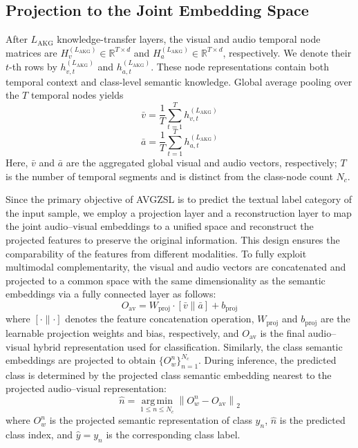 \documentclass[lettersize,journal]{IEEEtran}
\begin{document}
\subsection{Projection to the Joint Embedding Space}
After $L_{\mathrm{AKG}}$ knowledge-transfer layers, the visual and audio temporal node matrices are $H_v^{(L_{\mathrm{AKG}})}\in\mathbb{R}^{T\times d}$ and $H_a^{(L_{\mathrm{AKG}})}\in\mathbb{R}^{T\times d}$, respectively. We denote their $t$-th rows by $h_{v,t}^{(L_{\mathrm{AKG}})}$ and $h_{a,t}^{(L_{\mathrm{AKG}})}$. These node representations contain both temporal context and class-level semantic knowledge. Global average pooling over the $T$ temporal nodes yields
\begin{equation}
\bar{v}=\frac{1}{T}\sum_{t=1}^{T}h_{v,t}^{(L_{\mathrm{AKG}})}
\end{equation}
\begin{equation}
\bar{a}=\frac{1}{T}\sum_{t=1}^{T}h_{a,t}^{(L_{\mathrm{AKG}})}
\end{equation}
Here, $\bar{v}$ and $\bar{a}$ are the aggregated global visual and audio vectors, respectively; $T$ is the number of temporal segments and is distinct from the class-node count $N_c$.


Since the primary objective of AVGZSL is to predict the textual label category of the input sample, we employ a projection layer and a reconstruction layer to map the joint audio–visual embeddings to a unified space and reconstruct the projected features to preserve the original information. This design ensures the comparability of the features from different modalities. To fully exploit multimodal complementarity, the visual and audio vectors are concatenated and projected to a common space with the same dimensionality as the semantic embeddings via a fully connected layer as follows:
\begin{equation}
O_{\text{av}} = W_{\text{proj}} \cdot \left[ \bar{v} \parallel \bar{a} \right] + b_{\text{proj}}
\end{equation}
where $\left[ \cdot \parallel \cdot \right]$ denotes the feature concatenation operation, $W_{\text{proj}}$ and $b_{\text{proj}}$ are the learnable projection weights and bias, respectively, and $O_{\text{av}}$ is the final audio–visual hybrid representation used for classification. Similarly, the class semantic embeddings are projected to obtain $\{O_w^n\}_{n=1}^{N_c}$. During inference, the predicted class is determined by the projected class semantic embedding nearest to the projected audio--visual representation:
\begin{equation}
\widehat n=\operatorname*{arg\,min}_{1\le n\le N_c}\left\|O_w^n-O_{\text{av}}\right\|_2
\end{equation}
where $O_w^n$ is the projected semantic representation of class $y_n$, $\widehat n$ is the predicted class index, and $\widehat y=y_{\widehat n}$ is the corresponding class label.
\end{document}
